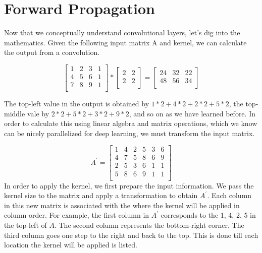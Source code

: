 \documentclass{exam}
\begin{document}
\section{Forward Propagation}
Now that we conceptually understand convolutional layers, let's dig into the mathematics. Given the following input matrix A and kernel, we can calculate the output from a convolution.

\[
\begin{bmatrix}
    1 & 2 & 3 & 1\\
    4 & 5 & 6 & 1\\
    7 & 8 & 9 & 1\\
\end{bmatrix}
 *
\begin{bmatrix}
    2 & 2\\
    2 & 2\\
\end{bmatrix}
=
\begin{bmatrix}
    24 & 32 & 22\\
    48 & 56 & 34\\
\end{bmatrix}
\]

The top-left value in the output is obtained by $1*2 + 4*2 + 2*2 + 5*2$, the top-middle vale by $2*2 + 5*2 + 3*2 + 9*2$, and so on as we have learned before. In order to calculate this using linear algebra and matrix operations, which we know can be nicely parallelized for deep learning, we must transform the input matrix.

\[
A^{'} = 
\begin{bmatrix}
    1 & 4 & 2 & 5 & 3 & 6\\
    4 & 7 & 5 & 8 & 6 & 9\\
    2 & 5 & 3 & 6 & 1 & 1\\
    5 & 8 & 6 & 9 & 1 & 1\\
\end{bmatrix}
\]
In order to apply the kernel, we first prepare the input information. We pass the kernel size to the matrix and apply a transformation to obtain $A^{'}$. Each column in this new matrix is associated with the where the kernel will be applied in column order. For example, the first column in $A^{'}$ corresponds to the 1, 4, 2, 5 in the top-left of $A$. The second column represents the bottom-right corner. The third column goes one step to the right and back to the top. This is done till each location the kernel will be applied is listed.
\end{document}
